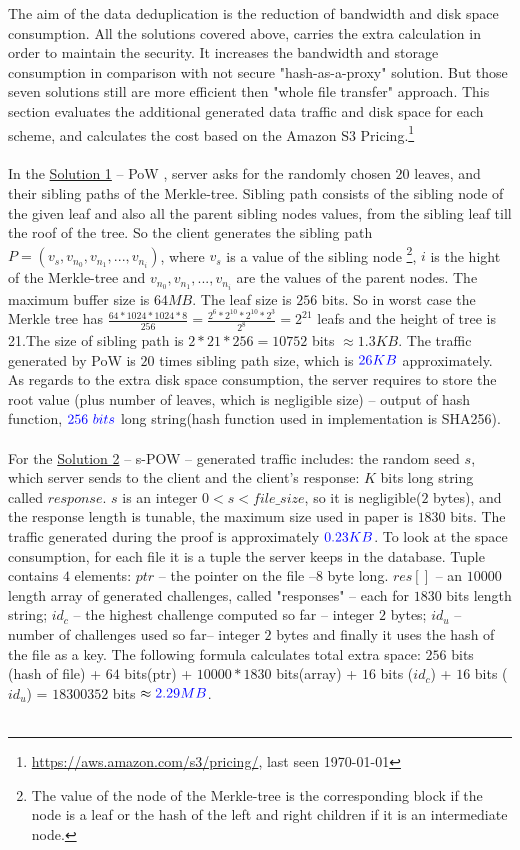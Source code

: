 \documentclass[12pt]{article}
\begin{document}
The aim of the data deduplication is the reduction of bandwidth and disk space consumption. All the solutions covered above, carries the extra calculation in order to maintain the security. It increases  the bandwidth and storage consumption in comparison with not secure "hash-as-a-proxy" solution. But those seven solutions still are more efficient then "whole file transfer" approach. This section evaluates the additional  generated data traffic and disk space for each scheme, and  calculates the cost  based on the Amazon S3 Pricing.\footnote{\url{https://aws.amazon.com/s3/pricing/}, last seen \today}\\\\
In the \hyperref[sub:Soltuion1]{Solution 1} -- PoW , server asks for the  randomly chosen $20$ leaves,  and their sibling paths of the Merkle-tree. Sibling path consists of the sibling node of the given leaf and also all the parent sibling nodes values, from the sibling leaf till the roof of the tree. So the client generates the sibling path $P=(v_s,v_{n_0},v_{n_1},...,v_{n_i})$, where $v_s$ is a value of the sibling node \footnote{The value of the node of the Merkle-tree is the corresponding block if the node is a leaf or the hash of the left and right children if it is an intermediate node.}, $i$ is the hight of the Merkle-tree and $v_{n_0},v_{n_1},...,v_{n_i}$ are the values of the parent nodes. The maximum buffer size is $64MB$. The leaf size is $256$ bits. So in worst case the Merkle tree has $\frac{64 * 1024* 1024 * 8}{256} = \frac{2^6*2^10*2^10*2^3}{2^8}=2^{21}$ leafs and the height of tree is 21.The size of sibling path is $2*21*256=10752$ bits  $\approx 1.3 KB$. The traffic generated by PoW is $20$ times sibling path size, which is $\color{blue}26KB$  approximately. As regards to the extra disk space consumption, the server requires to store the root value (plus number of leaves, which is negligible size) -- output of hash function, $\color{blue}256\ bits$  long string(hash function used in implementation is SHA256).\\\\
 For the \hyperref[sub:Soltuion2]{Solution 2} -- s-POW -- generated traffic includes: the random seed $s$, which server sends to the client and the client's response: $K$ bits long string called $response$. $s$ is an integer $0<s<file\_size$, so it is negligible($2$ bytes), and the response length is tunable, the maximum size used in paper is $1830$ bits. The traffic generated during the proof is  approximately $\color{blue}0.23 KB$. To look at the space consumption, for each file it is a tuple the server keeps in the database. Tuple contains  $4$ elements: $ptr$ -- the pointer on the file --$8$ byte long. $res []$ -- an $10000$ length array of generated challenges, called "responses" -- each for $1830$ bits length string; $id_c$ -- the highest challenge computed so far -- integer $2$ bytes; $id_u$ -- number of challenges used so far-- integer $2$ bytes and finally it uses the hash of the file as a key. The following formula calculates total extra space: $256$ bits (hash of file) + $64$ bits(ptr) + $10 000 * 1830$ bits(array) + $16$ bits ($id_c$) + $16$ bits ($id_u$) = $18300352$ bits $\approx\color{blue}2.29 MB$. \\\\  
\end{document}
